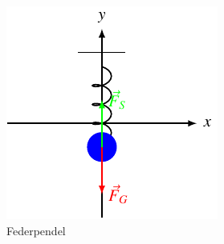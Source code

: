 %
%
%
\begin{figure}
\centering
\includegraphics{papers/fourier/images/federpendel.pdf}
\caption{Federpendel\label{fourier:fig:federpendel}}
\end{figure}